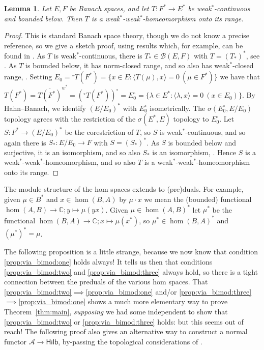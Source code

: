 \documentclass[a4paper,11pt]{article}
\theoremstyle{plain}
\newtheorem{lemma}[proposition]{Lemma}
\theoremstyle{remark}
\newcommand{\mc}[1]{\mathcal{#1}}
\newcommand{\ip}[2]{{\langle {#1} , {#2} \rangle}}
\newcommand{\catHilb}{\textsf{Hilb}}
\begin{document}
\begin{lemma}\label{lem:iso_plus_ws_means_wsh}
Let $E,F$ be Banach spaces, and let $T \colon F^* \to E^*$ be weak$^*$-continuous and bounded below.  Then $T$ is a weak$^*$-weak$^*$-homeomorphism onto its range.  
\end{lemma}
\begin{proof}
This is standard Banach space theory, though we do not know a precise reference, so we give a sketch proof, using results which, for example, can be found in \cite[Section~3.1]{MegginsonBook}.  As $T$ is weak$^*$-continuous, there is $T_* \in \mc B(E,F)$ with $T = (T_*)^*$, see \cite[Theorem~3.1.11]{MegginsonBook}.  As $T$ is bounded below, it has norm-closed range, and so also has weak$^*$-closed range, \cite[Theorem~3.1.21]{MegginsonBook}.  Setting $E_0 = {}^\circ T(F^*) = \{ x\in E : \ip{T(\mu)}{x}=0 \ (\mu\in F^*) \}$ we have that $T(F^*) = \overline{T(F^*)}^{w^*} = ({}^\circ T(F^*))^\circ = E_0^\circ = \{ \lambda\in E^* : \ip{\lambda}{x}=0 \ (x\in E_0) \}$.  By Hahn--Banach, we identify $(E/E_0)^*$ with $E_0^\circ$ isometrically.  The $\sigma(E_0^\circ, E/E_0)$ topology agrees with the restriction of the $\sigma(E^*,E)$ topology to $E_0^\circ$.  Let $S \colon F^* \to (E/E_0)^*$ be the corestriction of $T$, so $S$ is weak$^*$-continuous, and so again there is $S_* \colon E/E_0 \to F$ with $S = (S_*)^*$.  As $S$ is bounded below and surjective, it is an isomorphism, and so also $S_*$ is an isomorphism, \cite[Theorem~3.1.18]{MegginsonBook}.  Hence $S$ is a weak$^*$-weak$^*$-homeomorphism, and so also $T$ is a weak$^*$-weak$^*$-homeomorphism onto its range.
\end{proof}

The module structure of the hom spaces extends to (pre)duals.  For example, given $\mu\in B^*$ and $x\in\hom(B,A)$ by $\mu\cdot x$ we mean the (bounded) functional $\hom(A,B)\to\mathbb C; y\mapsto \mu(yx)$.  Given $\mu\in\hom(A,B)^*$ let $\mu^*$ be the functional $\hom(B,A) \to \mathbb C; x\mapsto \overline{\mu(x^*)}$, so $\mu^* \in \hom(B,A)^*$ and $(\mu^*)^* = \mu$.

The following proposition is a little strange, because we now know that condition \ref{prop:via_bimod:one} holds always!  It tells us then that conditions \ref{prop:via_bimod:two} and \ref{prop:via_bimod:three} always hold, so there is a tight connection between the preduals of the various hom spaces.  That \ref{prop:via_bimod:two}$\implies$\ref{prop:via_bimod:one} and/or \ref{prop:via_bimod:three}$\implies$\ref{prop:via_bimod:one} shows a much more elementary way to prove Theorem~\ref{thm:main}, \emph{supposing} we had some independent to show that \ref{prop:via_bimod:two} or \ref{prop:via_bimod:three} holds: but this seems out of reach!  The following proof also gives an alternative way to construct a normal functor $\mc A \to \catHilb$, by-passing the topological considerations of \cite[Proposition~2.13]{GLR_Wstar_categories}.
\end{document}

